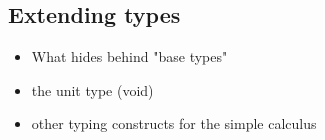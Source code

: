 \subsection{Extending types}

\begin{itemize}
    \item What hides behind "base types"
    \item the unit type (void)
    \item other typing constructs for the simple calculus
\end{itemize}